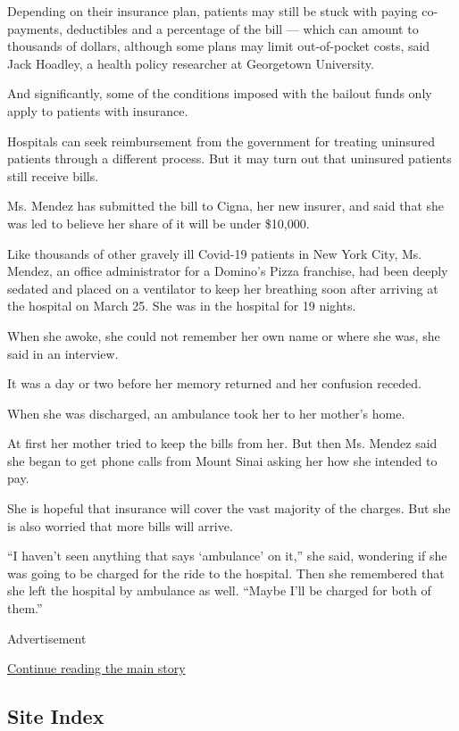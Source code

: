 Depending on their insurance plan, patients may still be stuck with
paying co-payments, deductibles and a percentage of the bill --- which
can amount to thousands of dollars, although some plans may limit
out-of-pocket costs, said Jack Hoadley, a health policy researcher at
Georgetown University.

And significantly, some of the conditions imposed with the bailout funds
only apply to patients with insurance.

Hospitals can seek reimbursement from the government for treating
uninsured patients through a different process. But it may turn out that
uninsured patients still receive bills.

Ms. Mendez has submitted the bill to Cigna, her new insurer, and said
that she was led to believe her share of it will be under \$10,000.

Like thousands of other gravely ill Covid-19 patients in New York City,
Ms. Mendez, an office administrator for a Domino's Pizza franchise, had
been deeply sedated and placed on a ventilator to keep her breathing
soon after arriving at the hospital on March 25. She was in the hospital
for 19 nights.

When she awoke, she could not remember her own name or where she was,
she said in an interview.

It was a day or two before her memory returned and her confusion
receded.

When she was discharged, an ambulance took her to her mother's home.

At first her mother tried to keep the bills from her. But then Ms.
Mendez said she began to get phone calls from Mount Sinai asking her how
she intended to pay.

She is hopeful that insurance will cover the vast majority of the
charges. But she is also worried that more bills will arrive.

``I haven't seen anything that says `ambulance' on it,'' she said,
wondering if she was going to be charged for the ride to the hospital.
Then she remembered that she left the hospital by ambulance as well.
``Maybe I'll be charged for both of them.''

Advertisement

\protect\hyperlink{after-bottom}{Continue reading the main story}

\hypertarget{site-index}{%
\subsection{Site Index}\label{site-index}}

